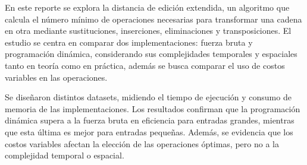 
En este reporte se explora la distancia de edición extendida, 
un algoritmo que 
calcula el número mínimo de operaciones necesarias 
para transformar una cadena en otra mediante sustituciones, 
inserciones, eliminaciones y transposiciones. 
El estudio se centra en comparar dos implementaciones:
fuerza bruta y programación dinámica, considerando sus 
complejidades temporales y espaciales tanto en teoría como
en práctica, además se busca comparar el uso de costos variables
en las operaciones.

Se diseñaron distintos datasets, 
midiendo el tiempo de ejecución y consumo de memoria
de las implementaciones. Los resultados confirman que la 
programación dinámica supera a la
fuerza bruta en eficiencia para entradas
grandes, mientras que esta última es mejor para entradas
pequeñas. Además, se evidencia que los costos 
variables afectan la elección de las operaciones
óptimas, pero no a la complejidad temporal o espacial.